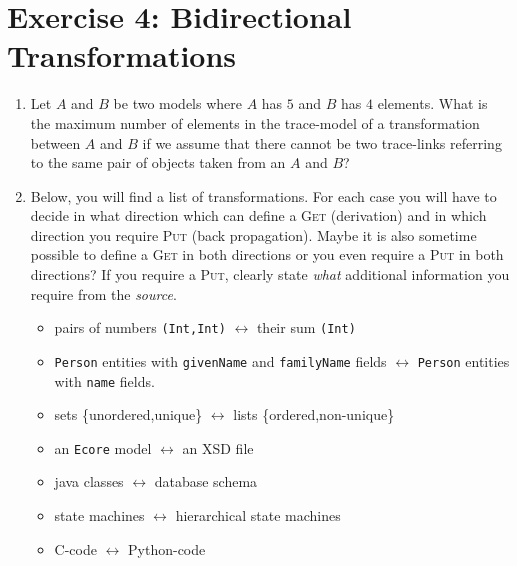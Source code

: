 \documentclass{article}
\begin{document}
	\clearpage
	
	\section*{Exercise 4: Bidirectional Transformations}
	
	\begin{enumerate}
		\item Let $A$ and $B$ be two models where $A$ has $5$ and $B$ has $4$ elements.
		What is the maximum number of elements in the trace-model \cite{DrivalosKolovosPF2009} of a transformation between $A$ and $B$ if we assume that there cannot be two trace-links referring to the same pair of objects taken from an $A$ and $B$?
		\item Below, you will find a list of transformations. For each case you will have to decide in what direction which can define a \textsc{Get} (derivation) and in which direction you require \textsc{Put} (back propagation).
		Maybe it is also sometime possible to define a \textsc{Get} in both directions or you even require a \textsc{Put} in both directions?
		If you require a \textsc{Put}, clearly state \emph{what} additional information you require from the \emph{source}.
		\begin{itemize}
			\item pairs of numbers \texttt{(Int,Int)} $\leftrightarrow$ their sum \texttt{(Int)}
			\item \texttt{Person} entities with \texttt{givenName} and \texttt{familyName} fields $\leftrightarrow$ \texttt{Person} entities with \texttt{name} fields.
			\item sets \{unordered,unique\} $\leftrightarrow$ lists \{ordered,non-unique\}
			\item an \texttt{Ecore} model $\leftrightarrow$ an XSD file
			\item java classes $\leftrightarrow$ database schema
			\item state machines $\leftrightarrow$ hierarchical state machines
			\item C-code $\leftrightarrow$ Python-code
		\end{itemize}
	\end{enumerate}



\end{document}

